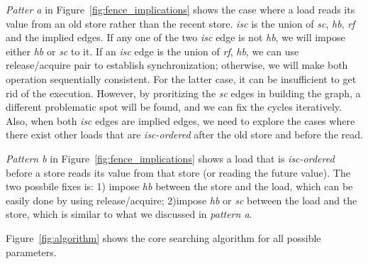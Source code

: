  \textit{Patter a} in
Figure~\ref{fig:fence_implications} shows the case where a load reads
its value from an old store rather than the recent store. \textit{isc} is
the union of \textit{sc}, \textit{hb}, \textit{rf} and the implied edges. If any one of
the two \textit{isc} edge is not \textit{hb}, we will impose either \textit{hb} or
\textit{sc} to it. If an \textit{isc} edge is the union of \textit{rf},
\textit{hb}, we can use release/acquire pair to establish synchronization;
otherwise, we will make both operation sequentially consistent. For the latter
case, it can be insufficient to get rid of the execution. However, by
proritizing the \textit{sc} edges in building the graph, a different problematic
spot will be found, and we can fix the cycles iteratively. Also, when both
\textit{isc} edges are implied edges, we need to explore the cases where there
exist other loads that are \textit{isc-ordered} after the old store and before
the read.


 \textit{Pattern b} in
Figure~\ref{fig:fence_implications} shows a load that is \textit{isc-ordered}
before a store reads its value from that store (or reading the future value).
The two possbile fixes is: 1) impose \textit{hb} between the store and the load,
which can be easily done by using release/acquire; 2)impose \textit{hb} or
\textit{sc} between the load and the store, which is similar to what we
discussed in \textit{pattern a}.


Figure~\ref{fig:algorithm} shows the core searching algorithm for all possible
parameters.

